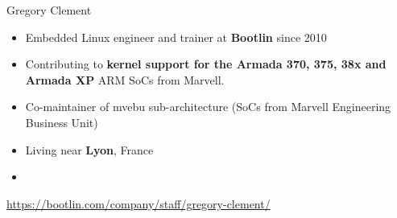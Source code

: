 \begin{frame}{Gregory Clement}
    \begin{itemize}
	\item Embedded Linux engineer and trainer at {\bf Bootlin}
              since 2010
	\item Contributing to {\bf kernel support for the Armada 370, 375, 38x and
	      Armada XP} ARM SoCs from Marvell.
	\item Co-maintainer of mvebu sub-architecture (SoCs from Marvell
    	      Engineering Business Unit)
	\item Living near {\bf Lyon}, France
	\item {}
    \end{itemize}
    {\small \url{https://bootlin.com/company/staff/gregory-clement/}}
\end{frame}

